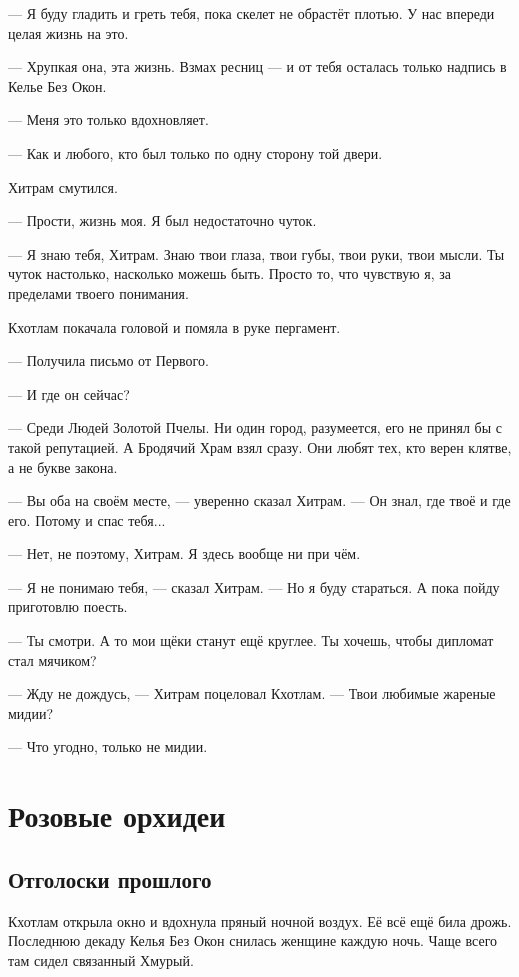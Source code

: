 --- Я буду гладить и греть тебя, пока скелет не обрастёт плотью.
У нас впереди целая жизнь на это.

--- Хрупкая она, эта жизнь.
Взмах ресниц --- и от тебя осталась только надпись в Келье Без Окон.

--- Меня это только вдохновляет.

--- Как и любого, кто был только по одну сторону той двери.

Хитрам смутился.

--- Прости, жизнь моя.
Я был недостаточно чуток.

--- Я знаю тебя, Хитрам.
Знаю твои глаза, твои губы, твои руки, твои мысли.
Ты чуток настолько, насколько можешь быть.
Просто то, что чувствую я, за пределами твоего понимания.

Кхотлам покачала головой и помяла в руке пергамент.

--- Получила письмо от Первого.

--- И где он сейчас?

--- Среди Людей Золотой Пчелы.
Ни один город, разумеется, его не принял бы с такой репутацией.
А Бродячий Храм взял сразу.
Они любят тех, кто верен клятве, а не букве закона.

--- Вы оба на своём месте, --- уверенно сказал Хитрам.
--- Он знал, где твоё и где его.
Потому и спас тебя...

--- Нет, не поэтому, Хитрам.
Я здесь вообще ни при чём.

--- Я не понимаю тебя, --- сказал Хитрам.
--- Но я буду стараться.
А пока пойду приготовлю поесть.

--- Ты смотри.
А то мои щёки станут ещё круглее.
Ты хочешь, чтобы дипломат стал мячиком?

--- Жду не дождусь, --- Хитрам поцеловал Кхотлам.
--- Твои любимые жареные мидии?

--- Что угодно, только не мидии.

\chapter{Розовые орхидеи}

\section{Отголоски прошлого}

Кхотлам открыла окно и вдохнула пряный ночной воздух.
Её всё ещё била дрожь.
Последнюю декаду Келья Без Окон снилась женщине каждую ночь.
Чаще всего там сидел связанный Хмурый.

